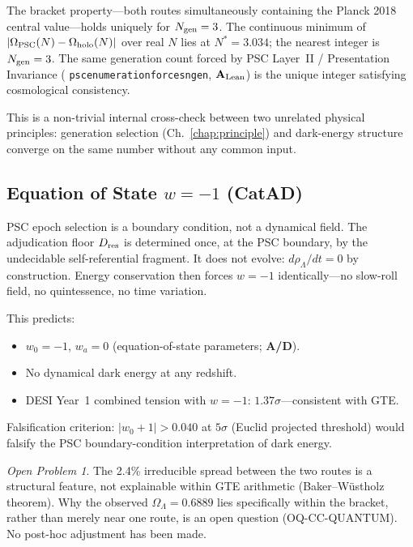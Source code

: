 \documentclass[11pt,openany]{book}
\theoremstyle{remark}
\newtheorem{openprob}{Open Problem}[chapter]
\newcommand{\lean}[1]{%
  \penalty-100
  \begingroup\def\_{\textunderscore\allowbreak}\texttt{#1}\endgroup}
\newcommand{\OmL}{\Omega_\Lambda}
\newcommand{\Dres}{D_{\rm res}}
\newcommand{\CatAL}{\ensuremath{\textbf{A}_{\rm Lean}}}
\newcommand{\CatAD}{\textbf{A/D}}
\begin{document}
The bracket property---both routes simultaneously containing the Planck 2018
central value---holds uniquely for $N_{\rm gen} = 3$.
The continuous minimum of $|\Omega_{\rm PSC}(N) - \Omega_{\rm holo}(N)|$ over
real $N$ lies at $N^* = 3.034$; the nearest integer is $N_{\rm gen} = 3$.
The same generation count forced by PSC Layer~II / Presentation Invariance
(\lean{psc\_enumeration\_forces\_ngen\_3}, \CatAL) is the unique integer satisfying
cosmological consistency.

This is a non-trivial internal cross-check between two unrelated physical principles:
generation selection (Ch.~\ref{chap:principle}) and dark-energy structure converge
on the same number without any common input.

\subsection*{Equation of State \texorpdfstring{$w = -1$}{w = -1} (CatAD)}

PSC epoch selection is a boundary condition, not a dynamical field.
The adjudication floor $\Dres$ is determined once, at the PSC boundary, by the
undecidable self-referential fragment.
It does not evolve: $d\rho_\Lambda/dt = 0$ by construction.
Energy conservation then forces $w = -1$ identically---no slow-roll field,
no quintessence, no time variation.

This predicts:
\begin{itemize}
\item $w_0 = -1$, $w_a = 0$ (equation-of-state parameters; \CatAD).
\item No dynamical dark energy at any redshift.
\item DESI Year~1 combined tension with $w=-1$: $1.37\sigma$---consistent with GTE.
\end{itemize}

Falsification criterion: $|w_0 + 1| > 0.040$ at $5\sigma$ (Euclid projected
threshold) would falsify the PSC boundary-condition interpretation of dark energy.

\begin{openprob}
The 2.4\% irreducible spread between the two routes is a structural feature,
not explainable within GTE arithmetic (Baker--W\"{u}stholz theorem).
Why the observed $\OmL = 0.6889$ lies specifically within the bracket,
rather than merely near one route, is an open question (OQ-CC-QUANTUM).
No post-hoc adjustment has been made.
\end{openprob}
\end{document}
